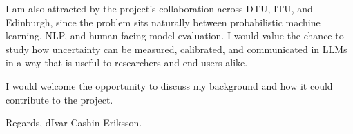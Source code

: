 \documentclass[11pt,a4paper]{moderncv}
\begin{document}
\hspace*{2em}
I am also attracted by the project's collaboration across DTU, ITU, and Edinburgh, since the problem sits naturally between probabilistic machine learning, NLP, and human-facing model evaluation. I would value the chance to study how uncertainty can be measured, calibrated, and communicated in LLMs in a way that is useful to researchers and end users alike.

\vspace*{2em}
I would welcome the opportunity to discuss my background and how it could contribute to the project. 

\vspace*{1em}
Regards, dIvar Cashin Eriksson.
\end{document}
